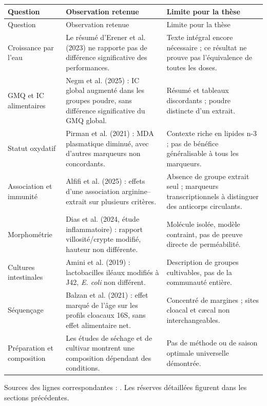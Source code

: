 \small
\begin{longtable}{@{}>{\raggedright\arraybackslash}p{3.2cm}>{\raggedright\arraybackslash}p{5.4cm}>{\raggedright\arraybackslash}p{6.2cm}@{}}
\toprule
Question & Observation retenue & Limite pour la thèse\\
\midrule
\endfirsthead
\toprule
Question & Observation retenue & Limite pour la thèse\\
\midrule
\endhead
Croissance par l'eau & Le résumé d'Erener et al. (2023) ne rapporte pas de différence significative des performances. & Texte intégral encore nécessaire ; ce résultat ne prouve pas l'équivalence de toutes les doses.\\
GMQ et IC alimentaires & Negm et al. (2025) : IC global augmenté dans les groupes poudre, sans différence significative du GMQ global. & Résumé et tableaux discordants ; poudre distincte d'un extrait.\\
Statut oxydatif & Pirman et al. (2021) : MDA plasmatique diminué, avec d'autres marqueurs non concordants. & Contexte riche en lipides n-3 ; pas de bénéfice généralisable à tous les marqueurs.\\
Association et immunité & Alfifi et al. (2025) : effets d'une association arginine--extrait sur plusieurs critères. & Absence de groupe extrait seul ; marqueurs transcriptionnels à distinguer des anticorps circulants.\\
Morphométrie & Dias et al. (2024, étude inflammatoire) : rapport villosité/crypte modifié, hauteur non différente. & Molécule isolée, modèle contraint, pas de preuve directe de perméabilité.\\
Cultures intestinales & Amini et al. (2019) : lactobacilles iléaux modifiés à J42, \textit{E. coli} non différent. & Description de groupes cultivables, pas de la communauté entière.\\
Séquençage & Balzan et al. (2021) : effet marqué de l'âge sur les profils cloacaux 16S, sans effet alimentaire net. & Concentré de margines ; sites cloacal et cæcal non interchangeables.\\
Préparation et composition & Les études de séchage et de cultivar montrent une composition dépendant des conditions. & Pas de méthode ou de saison optimale universelle démontrée.\\
\bottomrule
\end{longtable}
\normalsize
Sources des lignes correspondantes : \citet{Erener2023,Negm2025,Pirman2021,Alfifi2025,Dias2024,Amini2019,Balzan2021,CorAndrejc2022,Paskovic2025}. Les réserves détaillées figurent dans les sections précédentes.

